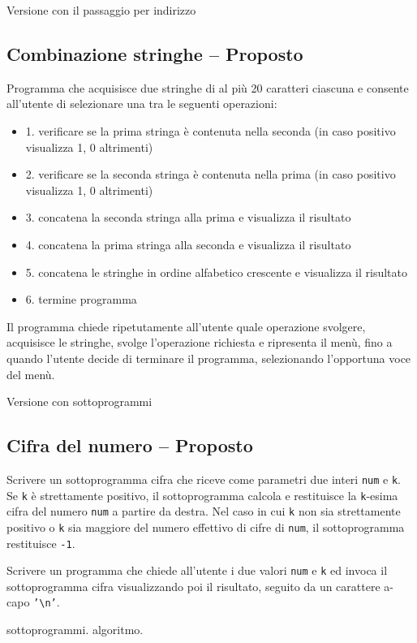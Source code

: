 
Versione con il passaggio per indirizzo



\prosep{}

\subsection{Combinazione stringhe -- Proposto}
Programma che acquisisce due stringhe di al pi\`u 20 caratteri ciascuna e consente all'utente di selezionare una tra le seguenti operazioni:\begin{itemize}
\item 1. verificare se la prima stringa \`e contenuta nella seconda (in caso positivo visualizza 1, 0 altrimenti)
\item 2. verificare se la seconda stringa \`e contenuta nella prima (in caso positivo visualizza 1, 0 altrimenti)
\item 3. concatena la seconda stringa alla prima e visualizza il risultato
\item 4. concatena la prima stringa alla seconda e visualizza il risultato
\item 5. concatena le stringhe in ordine alfabetico crescente e visualizza il risultato
\item 6. termine programma
\end{itemize}
Il programma chiede ripetutamente all'utente quale operazione svolgere, acquisisce le stringhe, svolge l'operazione richiesta e ripresenta il men\`u, fino a quando l'utente decide di terminare il programma, selezionando l'opportuna voce del men\`u.


Versione con sottoprogrammi


\subsection{Cifra del numero -- Proposto}
Scrivere un sottoprogramma cifra che riceve come parametri due interi \texttt{num} e \texttt{k}. Se \texttt{k} \`e strettamente positivo, il sottoprogramma calcola e restituisce la \texttt{k}-esima cifra del numero \texttt{num} a partire da destra. Nel caso in cui \texttt{k} non sia strettamente positivo o \texttt{k} sia maggiore del numero effettivo di cifre di \texttt{num}, il sottoprogramma restituisce \texttt{-1}.

Scrivere un programma che chiede all'utente i due valori \texttt{num} e \texttt{k} ed invoca il sottoprogramma cifra visualizzando poi il risultato, seguito da un carattere a-capo \texttt{'\textbackslash n'}.

\begin{tags}
sottoprogrammi. algoritmo.
\end{tags}


